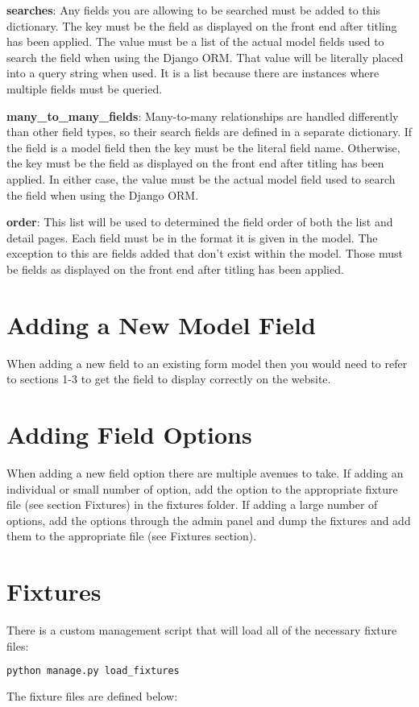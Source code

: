 \documentclass{article}
\begin{document}
\textbf{searches}: Any fields you are allowing to be searched must be added to this dictionary. The key must be the field as displayed on the front end after titling has been applied. The value must be a list of the actual model fields used to search the field when using the Django ORM. That value will be literally placed into a query string when used. It is a list because there are instances where multiple fields must be queried.

\textbf{many\_to\_many\_fields}: Many-to-many relationships are handled differently than other field types, so their search fields are defined in a separate dictionary. If the field is a model field then the key must be the literal field name. Otherwise, the key must be the field as displayed on the front end after titling has been applied. In either case, the value must be the actual model field used to search the field when using the Django ORM.

\textbf{order}: This list will be used to determined the field order of both the list and detail pages.  Each field must be in the format it is given in the model.  The exception to this are fields added that don't exist within the model. Those must be fields as displayed on the front end after titling has been applied.

\section{Adding a New Model Field}
When adding a new field to an existing form model then you would need to refer to sections 1-3 to get the field to display correctly on the website.

\section{Adding Field Options}
When adding a new field option there are multiple avenues to take.  If adding an individual or small number of option, add the option to the appropriate fixture file (see section Fixtures) in the fixtures folder. If adding a large number of options, add the options through the admin panel and dump the fixtures and add them to the appropriate file (see Fixtures section).

\section{Fixtures}
There is a custom management script that will load all of the necessary fixture files:
\begin{lstlisting}[language=bash]
  python manage.py load_fixtures
\end{lstlisting}
The fixture files are defined below:
\end{document}
